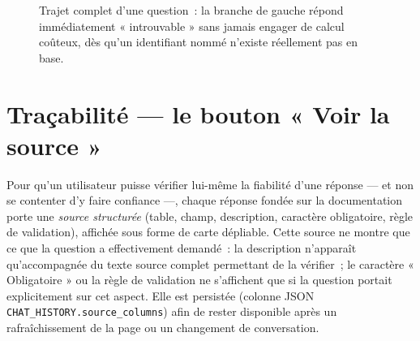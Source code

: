 ﻿\documentclass[12pt,a4paper]{report}
\newcommand{\code}[1]{\texttt{\color{biatbluedk}#1}}
\begin{document}
\begin{figure}[h]
\centering
{}
\caption{Trajet complet d'une question~: la branche de gauche répond immédiatement « introuvable » sans jamais engager de calcul coûteux, dès qu'un identifiant nommé n'existe réellement pas en base.}
\end{figure}

\section{Traçabilité --- le bouton « Voir la source »}
Pour qu'un utilisateur puisse vérifier lui-même la fiabilité d'une réponse --- et non se contenter d'y faire confiance ---, chaque réponse fondée sur la documentation porte une \emph{source structurée} (table, champ, description, caractère obligatoire, règle de validation), affichée sous forme de carte dépliable. Cette source ne montre que ce que la question a effectivement demandé~: la description n'apparaît qu'accompagnée du texte source complet permettant de la vérifier~; le caractère « Obligatoire » ou la règle de validation ne s'affichent que si la question portait explicitement sur cet aspect. Elle est persistée (colonne JSON \code{CHAT\_HISTORY.source\_columns}) afin de rester disponible après un rafraîchissement de la page ou un changement de conversation.
\end{document}
